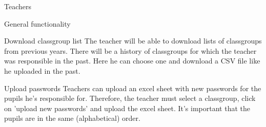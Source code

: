 \begin{section}{Teachers}
\begin{subsection}{General functionality}
				\begin{subsubsection}{Download classgroup list}
				The teacher will be able to download lists of classgroups from previous years. There will be a history of classgroups for which the teacher was responsible in the past. Here he can choose one and download a CSV file like he uploaded in the past.
				\end{subsubsection}
				
				\begin{subsubsection}{Upload passwords}
					Teachers can upload an excel sheet with new passwords for the pupils he's responsible for. Therefore, the teacher must select a classgroup, click on 'upload new passwords' and upload the excel sheet. It's important that the pupils are in the same (alphabetical) order.
				\end{subsubsection}
				

\end{subsection}
\end{section}
